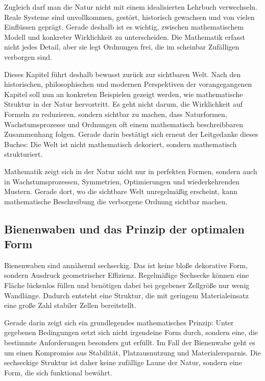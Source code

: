 Zugleich darf man die Natur nicht mit einem idealisierten Lehrbuch verwechseln.
Reale Systeme sind unvollkommen,
gestört,
historisch gewachsen
und von vielen Einflüssen geprägt.
Gerade deshalb ist es wichtig,
zwischen mathematischem Modell und konkreter Wirklichkeit zu unterscheiden.
Die Mathematik erfasst nicht jedes Detail,
aber sie legt Ordnungen frei,
die im scheinbar Zufälligen verborgen sind.

Dieses Kapitel führt deshalb bewusst zurück zur sichtbaren Welt.
Nach den historischen,
philosophischen
und modernen Perspektiven der vorangegangenen Kapitel
soll nun an konkreten Beispielen gezeigt werden,
wie mathematische Struktur in der Natur hervortritt.
Es geht nicht darum,
die Wirklichkeit auf Formeln zu reduzieren,
sondern sichtbar zu machen,
dass Naturformen,
Wachstumsprozesse
und Ordnungen oft einem mathematisch beschreibbaren Zusammenhang folgen.
Gerade darin bestätigt sich erneut der Leitgedanke dieses Buches:
Die Welt ist nicht mathematisch dekoriert,
sondern mathematisch strukturiert.

\begin{DidacticBox}
	Mathematik zeigt sich in der Natur nicht nur in perfekten Formen,
	sondern auch in Wachstumsprozessen,
	Symmetrien,
	Optimierungen
	und wiederkehrenden Mustern.
	Gerade dort,
	wo die sichtbare Welt unregelmäßig erscheint,
	kann mathematische Beschreibung die verborgene Ordnung sichtbar machen.
\end{DidacticBox}


\subsection{Bienenwaben und das Prinzip der optimalen Form}

Bienenwaben sind annähernd sechseckig.
Das ist keine bloße dekorative Form,
sondern Ausdruck geometrischer Effizienz.
Regelmäßige Sechsecke können eine Fläche lückenlos füllen
und benötigen dabei bei gegebener Zellgröße nur wenig Wandlänge.
Dadurch entsteht eine Struktur,
die mit geringem Materialeinsatz eine große Zahl stabiler Zellen bereitstellt.

Gerade darin zeigt sich ein grundlegendes mathematisches Prinzip:
Unter gegebenen Bedingungen setzt sich nicht irgendeine Form durch,
sondern eine,
die bestimmte Anforderungen besonders gut erfüllt.
Im Fall der Bienenwabe geht es um einen Kompromiss aus Stabilität,
Platzausnutzung
und Materialersparnis.
Die sechseckige Struktur ist daher keine zufällige Laune der Natur,
sondern eine Form,
die sich funktional bewährt.


